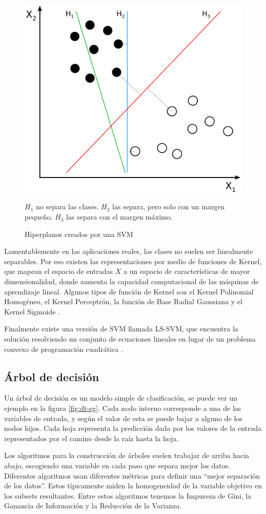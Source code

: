 \begin{figure}[htbp]
	\centering
	\includegraphics[width=0.4\linewidth]{graficos/svm_hiperplanos.png}
	\caption{Hiperplanos creados por una SVM \citep{wiki:svm_figure}}
	\label{fig:svm-hiperplanos}
	\par
	\small
	$H_1$ no separa las clases. $H_2$ las separa, pero solo con un margen pequeño. $H_3$ las separa con el margen máximo.
\end{figure}

Lamentablemente en las aplicaciones reales, las clases no suelen ser linealmente separables. Por eso existen las representaciones por medio de funciones de Kernel, que mapean el espacio de entradas $X$ a un espacio de características de mayor dimensionalidad, donde aumenta la capacidad computacional de las máquinas de aprendizaje lineal. Algunos tipos de función de Kernel son el Kernel Polinomial Homogéneo, el Kernel Perceptrón, la función de Base Radial Gaussiana y el Kernel Sigmoide \citep{cristianini2000introduction}.

Finalmente existe una versión de \ac{SVM} llamada \ac{LS-SVM}, que encuentra la solución resolviendo un conjunto de ecuaciones lineales en lugar de un problema convexo de programación cuadrática \citep{ak2002least}.

\subsection{Árbol de decisión}

Un árbol de decisión es un modelo simple de clasificación, se puede ver un ejemplo en la figura \ref{fig:dt-eg}. Cada nodo interno corresponde a una de las variables de entrada, y según el valor de esta se puede bajar a alguno de los nodos hijos. Cada hoja representa la predicción dada por los valores de la entrada representados por el camino desde la raíz hasta la hoja.

Los algoritmos para la construcción de árboles suelen trabajar de arriba hacia abajo, escogiendo una variable en cada paso que separa mejor los datos. Diferentes algoritmos usan diferentes métricas para definir una ``mejor separación de los datos''. Estos típicamente miden la homogeneidad de la variable objetivo en los subsets resultantes. Entre estos algoritmos tenemos la Impureza de Gini, la Ganancia de Información y la Reducción de la Varianza.

